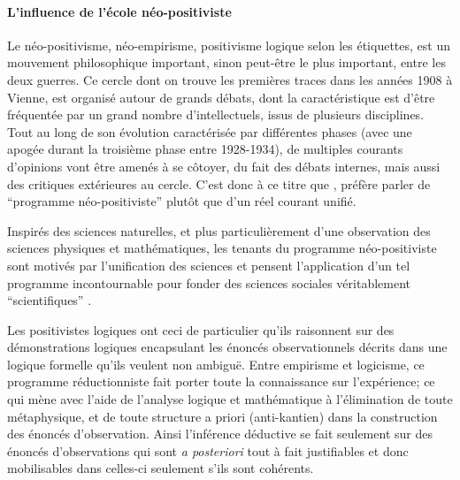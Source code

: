 
\paragraph{L'influence de l'école néo-positiviste}

Le néo-positivisme, néo-empirisme, positivisme logique selon les étiquettes, est un mouvement philosophique important, sinon peut-être le plus important, entre les deux guerres. Ce cercle dont on trouve les premières traces dans les années 1908 à Vienne, est organisé autour de grands débats, dont la caractéristique est d'être fréquentée par un grand nombre d'intellectuels, issus de plusieurs disciplines. Tout au long de son évolution caractérisée par différentes phases (avec une apogée durant la troisième phase entre 1928-1934), de multiples courants d'opinions \textcite[126]{Ouelbani2006} vont être amenés à se côtoyer, du fait des débats internes, mais aussi des critiques extérieures au cercle. C'est donc à ce titre que \textcite[11]{Ouelbani2006}, préfère parler de \enquote{programme néo-positiviste}  plutôt que d'un réel courant unifié.

Inspirés des sciences naturelles, et plus particulièrement d'une observation des sciences physiques et mathématiques, les tenants du programme néo-positiviste sont motivés par l'unification des sciences et pensent l'application d'un tel programme incontournable pour fonder des sciences sociales véritablement \enquote{scientifiques} \autocite[1-20]{Ouelbani2006}. 

Les positivistes logiques ont ceci de particulier qu'ils raisonnent sur des démonstrations logiques encapsulant les énoncés observationnels décrits dans une logique formelle qu'ils veulent non ambiguë. Entre empirisme et logicisme, ce programme réductionniste  fait porter toute la connaissance sur l'expérience; ce qui mène avec l'aide de l'analyse logique et mathématique à l'élimination de toute métaphysique, et de toute structure a priori (anti-kantien) dans la construction des énoncés d'observation. Ainsi l'inférence déductive se fait seulement sur des énoncés d'observations qui sont \textit{a posteriori} tout à fait justifiables et donc mobilisables dans celles-ci seulement s'ils sont cohérents.

